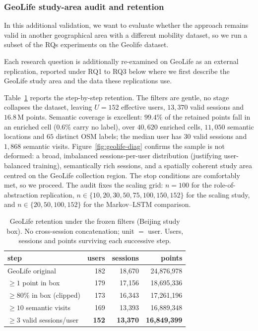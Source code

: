 \documentclass[sigconf,nonacm]{acmart}
\begin{document}
\subsubsection*{GeoLife study-area audit and retention}
\label{sec:geolife-audit}

In this additional validation, we want to evaluate whether the approach remains valid in another geographical area with a different mobility dataset, so we run a subset of the RQs experiments on the Geolife dataset.  

Each research question is additionally re-examined on GeoLife as an external replication, reported under RQ1 to RQ3 below where we first describe the GeoLife study area and the data these replications use.


Table~\ref{tab:geolife-audit} reports the step-by-step retention. The filters are gentle, no stage
collapses the dataset, leaving $U{=}152$ effective users, $13{,}370$ valid sessions and
$16.8$\,M points. Semantic coverage is excellent: $99.4\%$ of the retained points fall in an enriched
cell ($0.6\%$ carry no label), over $40{,}620$ enriched cells, $11{,}050$ semantic locations and $65$
distinct OSM labels; the median user has $30$ valid sessions and $1{,}868$ semantic visits.
Figure~\ref{fig:geolife-diag} confirms the sample is not deformed: a broad, imbalanced
sessions-per-user distribution (justifying user-balanced training), semantically rich sessions, and a
spatially coherent study area centred on the GeoLife collection region. The stop conditions are
comfortably met, so we proceed. The audit fixes the scaling grid: $n{=}100$ for the
role-of-abstraction replication, $n\in\{10,20,30,50,75,100,150,152\}$ for the scaling study, and
$n\in\{20,50,100,152\}$ for the Markov--LSTM comparison.

\begin{table}[t]
  \caption{GeoLife retention under the frozen filters (Beijing study box). No cross-session
  concatenation; unit $=$ user. Users, sessions and points surviving each successive step.}
  \label{tab:geolife-audit}
  \small
  \begin{tabular}{@{}lrrr@{}}
    \toprule
    step & users & sessions & points \\
    \midrule
    GeoLife original            & 182 & 18{,}670 & 24{,}876{,}978 \\
    $\ge1$ point in box         & 179 & 17{,}156 & 18{,}695{,}336 \\
    $\ge80\%$ in box (clipped)  & 173 & 16{,}343 & 17{,}261{,}196 \\
    $\ge10$ semantic visits     & 169 & 13{,}393 & 16{,}889{,}348 \\
    $\ge3$ valid sessions/user  & \textbf{152} & \textbf{13{,}370} & \textbf{16{,}849{,}399} \\
    \bottomrule
  \end{tabular}
\end{table}
\end{document}

